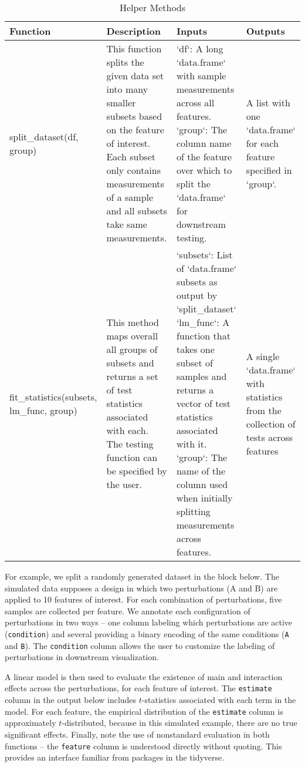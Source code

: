 \begin{Schunk}
\begin{table}

\caption{\label{tab:unnamed-chunk-2}Helper Methods}
\centering
\begin{tabu} to 
\hline
Function & Description & Inputs & Outputs\\
\hline
split\_dataset(df, group) & This function splits the given data set into many smaller subsets based on the feature of interest. Each subset only contains measurements of a sample and all subsets take same measurements. & `df`: A long `data.frame` with sample measurements across all features. `group`: The column name of the feature over which to split the `data.frame` for downstream testing. & A list with one `data.frame` for each feature specified in `group`.\\
\hline
fit\_statistics(subsets, lm\_func, group) & This method maps overall all groups of subsets and returns a set of test statistics associated with each. The testing function can be specified by the user. & `subsets`: List of `data.frame` subsets as output by `split\_dataset` `lm\_func`: A function that takes one subset of samples and returns a vector of test statistics associated with it. `group`: The name of the column used when initially splitting measurements across features. & A single `data.frame` with statistics from the collection of tests across features\\
\hline
\end{tabu}
\end{table}

\end{Schunk}

For example, we split a randomly generated dataset in the block below.
The simulated data supposes a design in which two perturbations (A and
B) are applied to 10 features of interest. For each combination of
perturbations, five samples are collected per feature. We annotate each
configuration of perturbations in two ways -- one column labeling which
perturbations are active (\texttt{condition}) and several providing a
binary encoding of the same conditions (\texttt{A} and \texttt{B}). The
\texttt{condition} column allows the user to customize the labeling of
perturbations in downstream visualization.

A linear model is then used to evaluate the existence of main and
interaction effects across the perturbations, for each feature of
interest. The \texttt{estimate} column in the output below includes
\(t\)-statistics associated with each term in the model. For each
feature, the empirical distribution of the \texttt{estimate} column is
approximately \(t\)-distributed, because in this simulated example,
there are no true significant effects. Finally, note the use of
nonstandard evaluation in both functions -- the \texttt{feature} column
is understood directly without quoting. This provides an interface
familiar from packages in the tidyverse.

